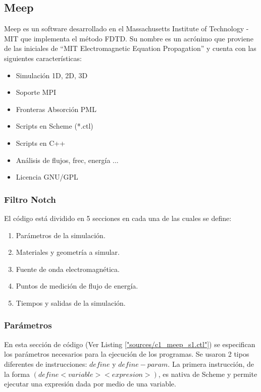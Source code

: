 \subsection{Meep}
\label{ss:c1_meep}

Meep es un software desarrollado en el Massachusetts Institute of Technology - MIT
que implementa el método FDTD. 
Su nombre es un acrónimo que proviene de las iniciales de 
“MIT Electromagnetic Equation Propagation” y cuenta con las siguientes características:

\begin{itemize}
\item Simulación 1D, 2D, 3D
\item Soporte MPI
\item Fronteras Absorción  PML 
\item Scripts  en Scheme (*.ctl)
\item Scripts en C++
\item Análisis de flujos, frec, energía ...
\item Licencia GNU/GPL
\end{itemize} 

\subsubsection{Filtro Notch}

El código está dividido en 5 secciones en cada una de las cuales se define: 
\begin{enumerate}
\item Parámetros de la simulación.
\item Materiales y geometría a simular.
\item Fuente de onda electromagnética.
\item Puntos de medición de flujo de energía.
\item Tiempos y salidas de la simulación.
\end{enumerate} 

\subsubsection{Parámetros}
En esta sección de código (Ver Listing \ref{"sources/c1_meep_s1.ctl"}) 
se especifican los parámetros necesarios para la ejecución de los programas. 
Se usaron 2 tipos diferentes de instrucciones: $define$ y $define-param$. 
La primera instrucción, de la forma $(define <variable> <expresion>)$, es nativa de Scheme y permite 
ejecutar una expresión dada por medio de una variable. 

